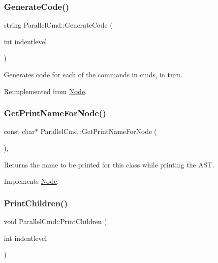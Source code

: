 \mbox{\label{class_parallel_cmd_abf18675730f4da91809cc31f7118dc96}} 
\subsubsection{\texorpdfstring{Generate\+Code()}{GenerateCode()}}
{\footnotesize\ttfamily string Parallel\+Cmd\+::\+Generate\+Code (\begin{DoxyParamCaption}\item[{int}]{indentlevel }\end{DoxyParamCaption})\hspace{0.3cm}{\ttfamily [virtual]}}

Generates code for each of the commands in cmds, in turn. 

Reimplemented from \hyperlink{class_node_acb60e526730e8436056375a3055c2c32}{Node}.

\mbox{\label{class_parallel_cmd_a7472916d75c070eda8dce632b39fe195}} 
\subsubsection{\texorpdfstring{Get\+Print\+Name\+For\+Node()}{GetPrintNameForNode()}}
{\footnotesize\ttfamily const char$\ast$ Parallel\+Cmd\+::\+Get\+Print\+Name\+For\+Node (\begin{DoxyParamCaption}{ }\end{DoxyParamCaption})\hspace{0.3cm}{\ttfamily [inline]}, {\ttfamily [virtual]}}

Returns the name to be printed for this class while printing the A\+ST. 

Implements \hyperlink{class_node_a56e29657306ffb004d69c6929ae44269}{Node}.

\mbox{\label{class_parallel_cmd_a03464113f3eca068ca4d0fd120cb27cc}} 
\subsubsection{\texorpdfstring{Print\+Children()}{PrintChildren()}}
{\footnotesize\ttfamily void Parallel\+Cmd\+::\+Print\+Children (\begin{DoxyParamCaption}\item[{int}]{indentlevel }\end{DoxyParamCaption})\hspace{0.3cm}{\ttfamily [virtual]}}


